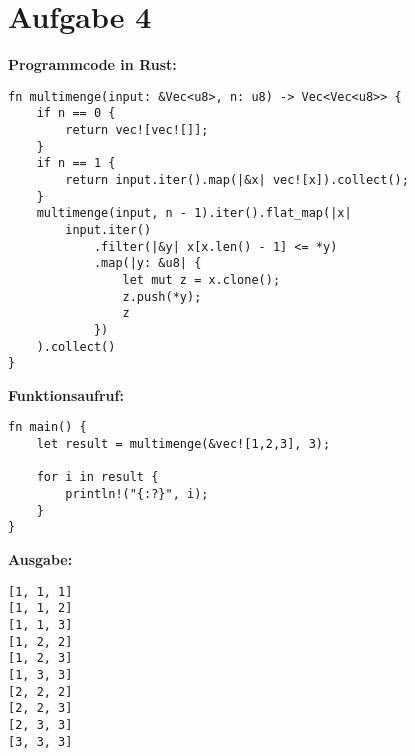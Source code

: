 \documentclass[a4paper]{scrartcl}
\begin{document}
\section*{Aufgabe 4}
\textbf{Programmcode in Rust:}
\begin{lstlisting}
fn multimenge(input: &Vec<u8>, n: u8) -> Vec<Vec<u8>> {
	if n == 0 {
		return vec![vec![]];
	}
	if n == 1 {
		return input.iter().map(|&x| vec![x]).collect();
	}
	multimenge(input, n - 1).iter().flat_map(|x| 
		input.iter()
			.filter(|&y| x[x.len() - 1] <= *y)
			.map(|y: &u8| {
				let mut z = x.clone();
				z.push(*y);
				z
			})
	).collect()
}
\end{lstlisting}
\newpage
\textbf{Funktionsaufruf:}
\begin{lstlisting}
fn main() {
	let result = multimenge(&vec![1,2,3], 3);

	for i in result {
		println!("{:?}", i);
	}
}
\end{lstlisting}
\textbf{Ausgabe:}
\begin{lstlisting}
[1, 1, 1]
[1, 1, 2]
[1, 1, 3]
[1, 2, 2]
[1, 2, 3]
[1, 3, 3]
[2, 2, 2]
[2, 2, 3]
[2, 3, 3]
[3, 3, 3]
\end{lstlisting}
\end{document}
